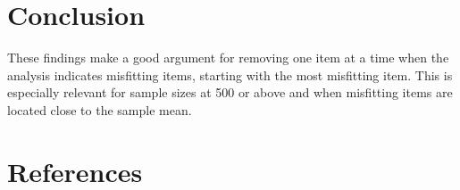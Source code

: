 \documentclass[
  letterpaper,
  DIV=11,
  numbers=noendperiod]{scrartcl}
\begin{document}
\section{Conclusion}\label{conclusion}

These findings make a good argument for removing one item at a time when
the analysis indicates misfitting items, starting with the most
misfitting item. This is especially relevant for sample sizes at 500 or
above and when misfitting items are located close to the sample mean.

\section*{References}\label{references}

\label{refs}
\end{document}
